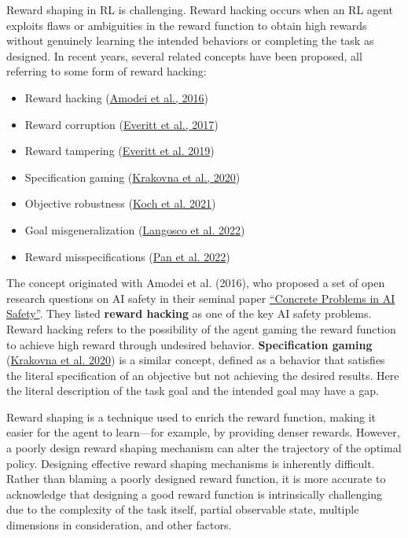 Reward shaping in RL is challenging. Reward hacking occurs when an RL agent exploits flaws or ambiguities in the reward function to obtain high rewards without genuinely learning the intended behaviors or completing the task as designed. In recent years, several related concepts have been proposed, all referring to some form of reward hacking:

\begin{itemize}
\tightlist
\item
  Reward hacking (\href{https://arxiv.org/abs/1606.06565}{Amodei et al., 2016})
\item
  Reward corruption (\href{https://arxiv.org/abs/1705.08417}{Everitt et al., 2017})
\item
  Reward tampering (\href{https://arxiv.org/abs/1908.04734}{Everitt et al. 2019})
\item
  Specification gaming (\href{https://deepmind.google/discover/blog/specification-gaming-the-flip-side-of-ai-ingenuity/}{Krakovna et al., 2020})
\item
  Objective robustness (\href{https://www.gatsby.ucl.ac.uk/~balaji/udl2021/accepted-papers/UDL2021-paper-055.pdf}{Koch et al. 2021})
\item
  Goal misgeneralization (\href{https://arxiv.org/abs/2105.14111}{Langosco et al. 2022})
\item
  Reward misspecifications (\href{https://arxiv.org/abs/2201.03544}{Pan et al. 2022})
\end{itemize}

The concept originated with Amodei et al. (2016), who proposed a set of open research questions on AI safety in their seminal paper \href{https://arxiv.org/abs/1606.06565}{``Concrete Problems in AI Safety''}. They listed \textbf{reward hacking} as one of the key AI safety problems. Reward hacking refers to the possibility of the agent gaming the reward function to achieve high reward through undesired behavior. \textbf{Specification gaming} (\href{https://deepmind.google/discover/blog/specification-gaming-the-flip-side-of-ai-ingenuity/}{Krakovna et al. 2020}) is a similar concept, defined as a behavior that satisfies the literal specification of an objective but not achieving the desired results. Here the literal description of the task goal and the intended goal may have a gap.

Reward shaping is a technique used to enrich the reward function, making it easier for the agent to learn---for example, by providing denser rewards. However, a poorly design reward shaping mechanism can alter the trajectory of the optimal policy. Designing effective reward shaping mechanisms is inherently difficult. Rather than blaming a poorly designed reward function, it is more accurate to acknowledge that designing a good reward function is intrinsically challenging due to the complexity of the task itself, partial observable state, multiple dimensions in consideration, and other factors.

